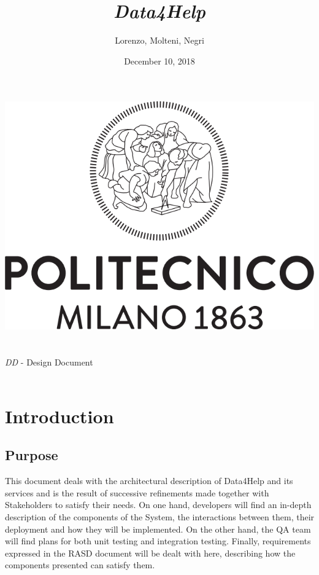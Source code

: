 \documentclass[titlepage]{article}
\title{{\Huge {\it Data4Help}}}
\author{Lorenzo, Molteni, Negri}
\date{December 10, 2018}
\begin{document}
\makeatletter
    \begin{titlepage}
        \begin{center}
            \includegraphics[width=\linewidth]{logo.png}\\[20ex]
            {\huge  \@title }\\[2ex] 
            {\LARGE  \@author}\\[3ex] 
            {\LARGE {\it DD} - Design Document}\\[3ex]
            {\large \@date}\\[5ex]
        \end{center}
    \end{titlepage}
\makeatother
\thispagestyle{empty}
\newpage

\thispagestyle{empty}
\newpage


	
\pagebreak
\tableofcontents{}
\pagebreak

\section{Introduction}
\subsection{Purpose}
This document deals with the architectural description of Data4Help and its services and is the result of successive refinements made together with Stakeholders to satisfy their needs.
On one hand, developers will find an in-depth description of the components of the System, the interactions between them, their deployment and how they will be implemented.
On the other hand, the QA team will find plans for both unit testing and integration testing.
Finally, requirements expressed in the RASD document will be dealt with here, describing how the components presented can satisfy them.
\end{document}
